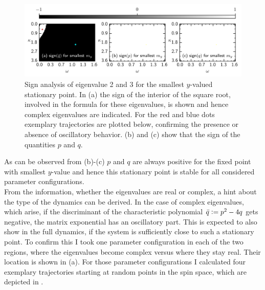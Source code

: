 \begin{figure}[H]
    \includegraphics{pictures/lam2_anal_s2.png}
    \caption{Sign analysis of eigenvalue 2 and 3 for the smallest $y$-valued stationary point. In (a) the sign of the interior of the square root, involved in the formula for these eigenvalues, is shown and hence complex eigenvalues are indicated. For the red and blue dots exemplary trajectories are plotted below, confirming the presence or absence of oscillatory behavior. (b) and (c) show that the sign of the quantities $p$ and $q$.}%
    \label{fig:sign_lam23_s}
\end{figure}%
As can be observed from  (b)-(c) $p$ and $q$ are always positive for the fixed point with smallest $y$-value and hence this stationary point is stable for all considered parameter configurations.\\
From the information, whether the eigenvalues are real or complex, a hint about the type of the dynamics can be derived. In the case of complex eigenvalues, which arise, if the discriminant of the characteristic polynomial $\bar{q}\vcentcolon=p^2-4q$ gets negative,  the matrix exponential has an oscillatory part. This is expected to also show in the full dynamics, if the system is sufficiently close to such a stationary point. To confirm this I took one parameter configuration in each of the two regions, where the eigenvalues become complex versus where they stay real. Their location is shown in  (a). For those parameter configurations I calculated four exemplary trajectories starting at random points in the spin space, which are depicted in .
